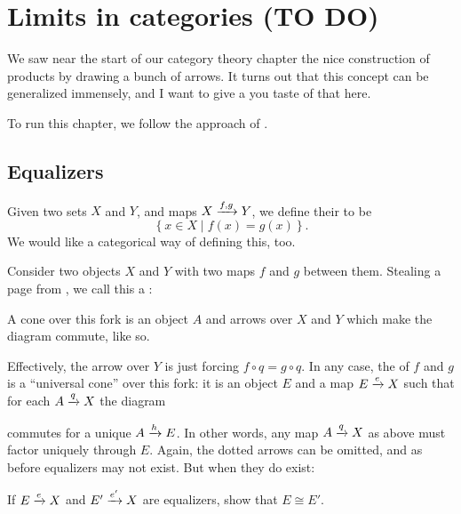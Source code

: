 \chapter{Limits in categories (TO DO)}
We saw near the start of our category theory chapter
the nice construction of products by drawing
a bunch of arrows.
It turns out that this concept can be generalized immensely,
and I want to give a you taste of that here.

To run this chapter, we follow the approach of \cite{ref:msci}.

\section{Equalizers}
Given two sets $X$ and $Y$, and maps $X \xrightarrow{f,g} Y$, we define their  to be
\[ \left\{ x \in X \mid f(x) = g(x) \right\}. \]
We would like a categorical way of defining this, too.

Consider two objects $X$ and $Y$ with two maps $f$ and $g$ between them.
Stealing a page from \cite{ref:msci}, we call this a :
\begin{center}
\end{center}
A cone over this fork is an object $A$ and arrows over $X$ and $Y$
which make the diagram commute, like so.
\begin{center}
\end{center}
Effectively, the arrow over $Y$ is just forcing $f \circ q = g \circ q$.
In any case, the  of $f$ and $g$ is a ``universal cone'' over this fork:
it is an object $E$ and a map $E \xrightarrow{e} X$ such that
for each $A \xrightarrow{q} X$ the diagram
\begin{center}
\end{center}
commutes for a unique $A \xrightarrow{h} E$.
In other words, any map $A \xrightarrow{q} X$ as above
must factor uniquely through $E$.
Again, the dotted arrows can be omitted,
and as before equalizers may not exist.
But when they do exist:
\begin{exercise}
	If $E \xrightarrow{e} X$ and $E' \xrightarrow{e'} X$ are equalizers,
	show that $E \cong E'$.
\end{exercise}

